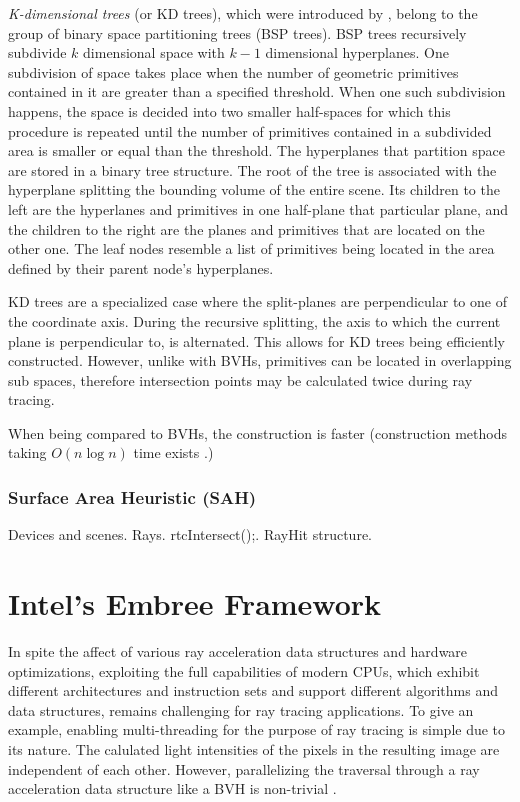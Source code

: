 \emph{K-dimensional trees} (or KD trees), which were introduced by \cite{bentley1975multidimensional}, belong to the group of binary space partitioning trees (BSP trees). BSP trees recursively subdivide $k$ dimensional space with $k-1$ dimensional hyperplanes. One subdivision of space takes place when the number of geometric primitives contained in it are greater than a specified threshold. When one such subdivision happens, the space is decided into two smaller half-spaces for which this procedure is repeated until the number of primitives contained in a subdivided area is smaller or equal than the threshold. The hyperplanes that partition space are stored in a binary  tree structure. The root of the tree is associated with the hyperplane splitting the bounding volume of the entire scene. Its children to the left are the hyperlanes and primitives in one half-plane that particular plane, and the children to the right are the planes and primitives that are located on the other one. The leaf nodes resemble a list of primitives being located in the area defined by their parent node's hyperplanes.

KD trees are a specialized case where the split-planes are perpendicular to one of the coordinate axis. During the recursive splitting, the axis to which the current plane is perpendicular to, is alternated. This allows for KD trees being efficiently constructed. However, unlike with BVHs, primitives can be located in overlapping sub spaces, therefore intersection points may be calculated twice during ray tracing. 

When being compared to BVHs, the construction is faster (construction methods taking $O(n\log n)$ time exists \cite{wald2001interactive}.)


\subsubsection{Surface Area Heuristic (SAH)}

Devices and scenes. Rays. rtcIntersect();. RayHit structure.

\section{Intel\textregistered's Embree Framework}
In spite the affect of various ray acceleration data structures and hardware optimizations, exploiting the full capabilities of modern CPUs, which exhibit different architectures and instruction sets and support different algorithms and data structures, remains challenging for ray tracing applications. To give an example, enabling multi-threading for the purpose of ray tracing is simple due to its nature. The calulated light intensities of the pixels in the resulting image are independent of each other. However, parallelizing the traversal through a ray acceleration data structure like a BVH is non-trivial .

